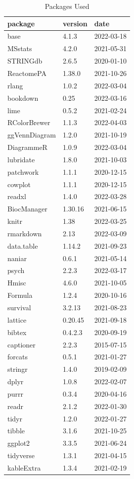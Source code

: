 \documentclass[9pt,lineno]{elife}
\begin{document}
\begin{longtable}[t]{lll}
\caption{\label{tab:package-table}Packages Used}\\
\toprule
package & version & date\\
\midrule
base & 4.1.3 & 2022-03-18\\
MSstats & 4.2.0 & 2021-05-31\\
STRINGdb & 2.6.5 & 2020-01-10\\
ReactomePA & 1.38.0 & 2021-10-26\\
rlang & 1.0.2 & 2022-03-04\\
\addlinespace
bookdown & 0.25 & 2022-03-16\\
lime & 0.5.2 & 2021-02-24\\
RColorBrewer & 1.1.3 & 2022-04-03\\
ggVennDiagram & 1.2.0 & 2021-10-19\\
DiagrammeR & 1.0.9 & 2022-03-04\\
\addlinespace
lubridate & 1.8.0 & 2021-10-03\\
patchwork & 1.1.1 & 2020-12-15\\
cowplot & 1.1.1 & 2020-12-15\\
readxl & 1.4.0 & 2022-03-28\\
BiocManager & 1.30.16 & 2021-06-15\\
\addlinespace
knitr & 1.38 & 2022-03-25\\
rmarkdown & 2.13 & 2022-03-09\\
data.table & 1.14.2 & 2021-09-23\\
naniar & 0.6.1 & 2021-05-14\\
psych & 2.2.3 & 2022-03-17\\
\addlinespace
Hmisc & 4.6.0 & 2021-10-05\\
Formula & 1.2.4 & 2020-10-16\\
survival & 3.2.13 & 2021-08-23\\
lattice & 0.20.45 & 2021-09-18\\
bibtex & 0.4.2.3 & 2020-09-19\\
\addlinespace
captioner & 2.2.3 & 2015-07-15\\
forcats & 0.5.1 & 2021-01-27\\
stringr & 1.4.0 & 2019-02-09\\
dplyr & 1.0.8 & 2022-02-07\\
purrr & 0.3.4 & 2020-04-16\\
\addlinespace
readr & 2.1.2 & 2022-01-30\\
tidyr & 1.2.0 & 2022-01-27\\
tibble & 3.1.6 & 2021-10-25\\
ggplot2 & 3.3.5 & 2021-06-24\\
tidyverse & 1.3.1 & 2021-04-15\\
\addlinespace
kableExtra & 1.3.4 & 2021-02-19\\
\bottomrule
\end{longtable}
\end{document}
